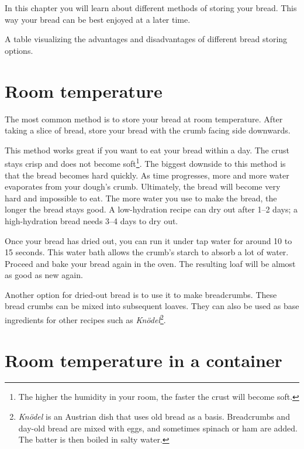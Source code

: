 In this chapter you will learn about different
methods of storing your bread. This way
your bread can be best enjoyed at a later
time.

\begin{table}[!htb]
    \begin{center}
        
        \caption[Options to store bread]{A table visualizing the advantages
            and disadvantages of different bread storing options.}%
        \label{table:bread-storage}
    \end{center}
\end{table}

\section{Room temperature}

The most common method is to store your bread
at room temperature. After taking a slice of bread,
store your bread with the crumb facing side
downwards.

This method works great if you want to eat
your bread within a day. The crust stays
crisp and does not become soft\footnote{The higher the humidity in your room,
    the faster the crust will become soft.}.
The biggest downside to this method is that
the bread becomes hard quickly. As time progresses,
more and more water evaporates from your dough's
crumb. Ultimately, the bread will become very hard
and impossible to eat. The more water you use
to make the bread, the longer the bread stays good.
A low-hydration recipe can dry out after 1--2 days;
a high-hydration bread needs 3--4 days to dry out.

Once your bread has dried out, you can run it under
tap water for around 10 to 15 seconds.
This water bath allows the
crumb's starch to absorb a lot of water. Proceed and
bake your bread again in the oven. The resulting loaf
will be almost as good as new again.

Another option for dried-out bread is to use it
to make breadcrumbs. These bread crumbs can be mixed
into subsequent loaves. They can also be used as
base ingredients for other recipes such as \emph{Knödel}\footnote{\emph{Knödel} is an
    Austrian dish that uses old bread as a basis.
  Breadcrumbs and day-old bread are mixed with eggs, and sometimes
  spinach or ham are added. The batter is then boiled in salty water.
}.

\section{Room temperature in a container}

